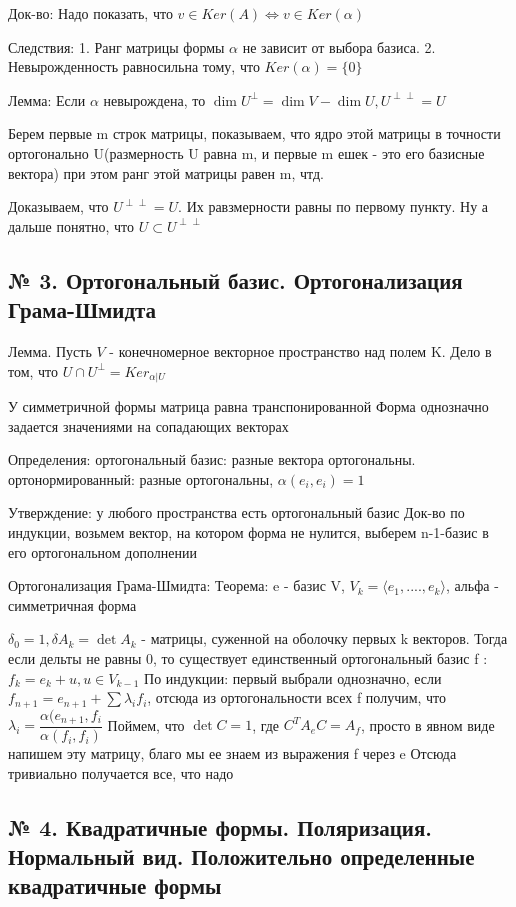 \documentclass{article}
\begin{document}
Док-во:
Надо показать, что $v \in Ker(A) \Leftrightarrow v \in Ker(\alpha)$

Следствия:
1. Ранг матрицы формы $\alpha$ не зависит от выбора базиса.
2. Невырожденность равносильна тому, что $Ker(\alpha) = \{0\}$

Лемма:
Если $\alpha$ невырождена, то $\dim{U^\perp} = \dim V - \dim U, U^{\perp \perp} = U$

Берем первые m строк матрицы, показываем, что ядро этой матрицы в точности ортогонально U(размерность U равна m, и первые m ешек - это его базисные вектора) при этом ранг этой матрицы равен m, чтд.

Доказываем, что $U^{\perp \perp} = U$. Их равзмерности равны по первому пункту.
Ну а дальше понятно, что $U \subset U^{\perp \perp}$

\subsection{\tiny № 3. Ортогональный базис. Ортогонализация Грама-Шмидта}

Лемма. Пусть $V$ - конечномерное векторное пространство над полем K. 
Дело в том, что $U \cap U^\perp = Ker_{\alpha | U}$

У симметричной формы матрица равна транспонированной
Форма однозначно задается значениями на сопадающих векторах

Определения: ортогональный базис: разные вектора ортогональны.
ортонормированный: разные ортогональны, $\alpha(e_i, e_i) = 1$

Утверждение: у любого пространства есть ортогональный базис
Док-во по индукции, возьмем вектор, на котором форма не нулится, выберем n-1-базис в его ортогональном дополнении

Ортогонализация Грама-Шмидта:
Теорема: e - базис V, $V_k = \langle e_1, ...., e_k \rangle$, альфа - симметричная форма

$\delta_0 = 1, \delta{A_k} = \det{A_k}$ - матрицы, суженной на оболочку первых k векторов.
Тогда если дельты не равны 0, то существует единственный ортогональный базис f : $f_k = e_k + u, u \in V_{k - 1}$
По индукции: первый выбрали однозначно, если $f_{n + 1} = e_{n + 1} + \sum{\lambda_i f_i}$, отсюда из ортогональности всех f получим, что $\lambda_i = \dfrac{\alpha(e_{n + 1}, f_i}{\alpha(f_i, f_i)}$
Поймем, что $\det C = 1$, где $C^TA_eC = A_f$, просто в явном виде напишем эту матрицу, благо мы ее знаем из выражения f через e
Отсюда тривиально получается все, что надо

\subsection{\tiny № 4. Квадратичные формы. Поляризация. Нормальный вид. Положительно определенные квадратичные формы}
\end{document}
